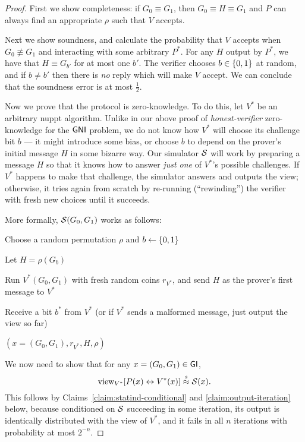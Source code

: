 \documentclass[11pt]{article}
\begin{document}
\begin{proof}
  First we show completeness: if $G_0 \equiv G_1$, then $G_0 \equiv H
  \equiv G_1$ and $P$ can always find an appropriate $\rho$ such that
  $V$ accepts.

  Next we show soundness, and calculate the probability that $V$
  accepts when $G_0 \not\equiv G_1$ and interacting with some
  arbitrary $P^{*}$.  For any $H$ output by $P^{*}$, we have that $H
  \equiv G_{b'}$ for at most one $b'$.  The verifier chooses $b \in
  \{0,1\}$ at random, and if $b\neq b'$ then there is \emph{no} reply
  which will make $V$ accept.  We can conclude that the soundness
  error is at most $\frac{1}{2}$.

  Now we prove that the protocol is zero-knowledge.  To do this, let
  $V^{*}$ be an arbitrary nuppt algorithm.  Unlike in our above proof
  of \emph{honest-verifier} zero-knowledge for the $\mathsf{GNI}$ problem, we
  do not know how $V^{*}$ will choose its challenge bit $b$ --- it
  might introduce some bias, or choose $b$ to depend on the prover's
  initial message $H$ in some bizarre way.  Our simulator $\mathcal{S}$ will
  work by preparing a message $H$ so that it knows how to answer
  \emph{just one} of $V^{*}$'s possible challenges.  If $V^{*}$
  happens to make that challenge, the simulator answers and outputs
  the view; otherwise, it tries again from scratch by re-running
  (``rewinding'') the verifier with fresh new choices until it
  succeeds.

  More formally, $\mathcal{S}(G_{0},G_{1})$ works as follows: 
  \begin{algorithmic}
    \REPEAT

    \STATE Choose a random permutation $\rho$ and $b \gets \{0,1\}$

    \STATE Let $H= \rho(G_b)$

    \STATE Run $V^*(G_{0}, G_{1})$ with fresh random coins $r_{V^*}$,
    and send $H$ as the prover's first message to $V^{*}$

    \STATE Receive a bit $b^{*}$ from $V^*$ (or if $V^{*}$ sends a
    malformed message, just output the view so far)


    \RETURN $(x = (G_{0}, G_{1}), r_{V^*}, H, \rho)$
  \end{algorithmic}

  We now need to show that for any $x = (G_{0},G_{1}) \in \mathsf{GI}$, \[
  \text{view}_{V^{*}} [ P(x) \leftrightarrow V^{*}(x) ] \stackrel{s}{\approx} \mathcal{S}(x). \]
  This follows by Claims~\ref{claim:statind-conditional} and
  \ref{claim:output-iteration} below, because conditioned on $\mathcal{S}$
  succeeding in some iteration, its output is identically distributed
  with the view of $V^{*}$, and it fails in all $n$ iterations with
  probability at most $2^{-n}$.
\end{proof}
\end{document}
